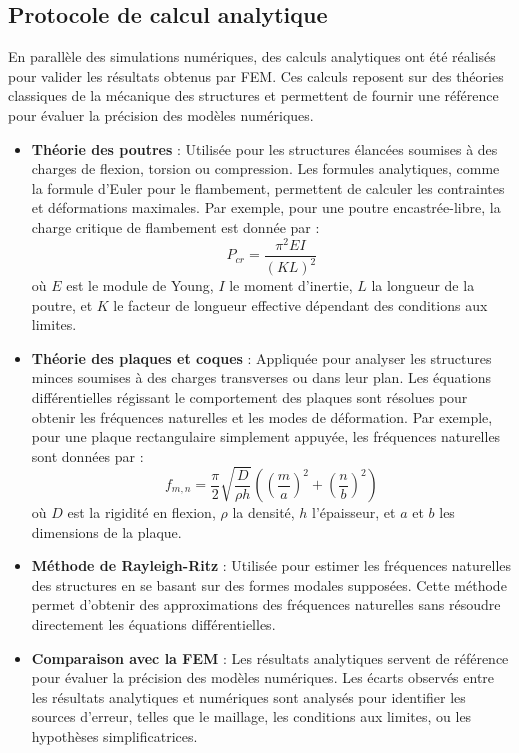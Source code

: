 \subsection{Protocole de calcul analytique}

En parallèle des simulations numériques, des calculs analytiques ont été réalisés pour 
valider les résultats obtenus par \acrshort{FEM}. Ces calculs reposent sur des théories 
classiques de la mécanique des structures et permettent de fournir une référence pour 
évaluer la précision des modèles numériques.

\begin{itemize}
    \item \textbf{Théorie des poutres} :
    Utilisée pour les structures élancées soumises à des charges de flexion, torsion ou 
    compression. Les formules analytiques, comme la formule d'Euler pour le flambement, 
    permettent de calculer les contraintes et déformations maximales. Par exemple, pour 
    une poutre encastrée-libre, la charge critique de flambement est donnée par :
    \[
    P_{cr} = \frac{\pi^2 E I}{(K L)^2}
    \]
    où \(E\) est le module de Young, \(I\) le moment d'inertie, \(L\) la longueur de la 
    poutre, et \(K\) le facteur de longueur effective dépendant des conditions aux 
    limites.

    \item \textbf{Théorie des plaques et coques} :
    Appliquée pour analyser les structures minces soumises à des charges transverses 
    ou dans leur plan. Les équations différentielles régissant le comportement des 
    plaques sont résolues pour obtenir les fréquences naturelles et les modes de 
    déformation. Par exemple, pour une plaque rectangulaire simplement appuyée, les 
    fréquences naturelles sont données par :
    \[
    f_{m,n} = \frac{\pi}{2} \sqrt{\frac{D}{\rho h}} \left( \left( \frac{m}{a} \right)^2
     + \left( \frac{n}{b} \right)^2 \right)
    \]
    où \(D\) est la rigidité en flexion, \(\rho\) la densité, \(h\) l'épaisseur, et
     \(a\) et \(b\) les dimensions de la plaque.

    \item \textbf{Méthode de Rayleigh-Ritz} :
    Utilisée pour estimer les fréquences naturelles des structures en se basant sur 
    des formes modales supposées. Cette méthode permet d'obtenir des approximations 
    des fréquences naturelles sans résoudre directement les équations différentielles.

    \item \textbf{Comparaison avec la \acrshort{FEM}} :
    Les résultats analytiques servent de référence pour évaluer la précision des modèles
     numériques. Les écarts observés entre les résultats analytiques et numériques sont 
     analysés pour identifier les sources d'erreur, telles que le maillage, les conditions
      aux limites, ou les hypothèses simplificatrices.
\end{itemize}

